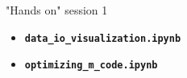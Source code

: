 \begin{frame}{"Hands on" session 1}
\begin{itemize}
\itemsep5em
\item
\textbf{\color{DarkBlue}\texttt{data\_io\_visualization.ipynb}}

\item
\textbf{\color{DarkBlue}\texttt{optimizing\_m\_code.ipynb}}
\end{itemize}
\end{frame}
